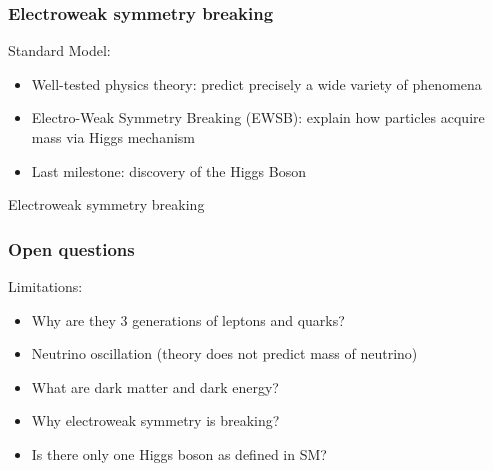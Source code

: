 \documentclass{beamer}
\begin{document}

   \begin{frame}
     \frametitle{Electroweak symmetry breaking}

     \begin{block}{Standard Model:}
        \begin{itemize}
          \item Well-tested physics theory: predict precisely a wide variety of phenomena
          \item Electro-Weak Symmetry Breaking (EWSB): explain how particles acquire mass via Higgs mechanism
          \item Last milestone: discovery of the Higgs Boson
        \end{itemize}
     \end{block}

     \begin{block}{Electroweak symmetry breaking}
     \end{block}
   \end{frame} 
    
    \begin{frame}
      \frametitle{Open questions}


      \begin{alertblock}{Limitations:}
        \begin{itemize}
          \item Why are they 3 generations of leptons and quarks?
          \item Neutrino oscillation (theory does not predict mass of neutrino)
          \item What are dark matter and dark energy?
          \item Why electroweak symmetry is breaking?
          \item Is there only one Higgs boson as defined in SM?
        \end{itemize}
      \end{alertblock}
      
    \end{frame}
    
\end{document}
